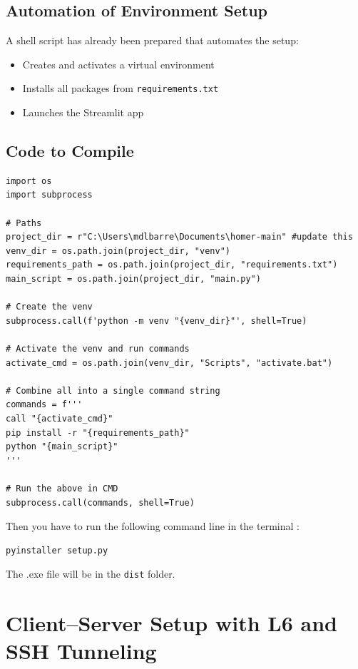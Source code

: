 \documentclass[11pt,a4paper]{report}
\begin{document}
\subsection*{Automation of Environment Setup}

A shell script has already been prepared that automates the setup:
\begin{itemize}
    \item Creates and activates a virtual environment
    \item Installs all packages from \texttt{requirements.txt}
    \item Launches the Streamlit app
\end{itemize}

\subsection*{Code to Compile}


\vspace{0.5em}
\begin{lstlisting}[caption={setup.py file in the main root to compile}]
import os
import subprocess

# Paths 
project_dir = r"C:\Users\mdlbarre\Documents\homer-main" #update this
venv_dir = os.path.join(project_dir, "venv")
requirements_path = os.path.join(project_dir, "requirements.txt")
main_script = os.path.join(project_dir, "main.py")

# Create the venv
subprocess.call(f'python -m venv "{venv_dir}"', shell=True)

# Activate the venv and run commands
activate_cmd = os.path.join(venv_dir, "Scripts", "activate.bat")

# Combine all into a single command string
commands = f'''
call "{activate_cmd}"
pip install -r "{requirements_path}"
python "{main_script}"
'''

# Run the above in CMD
subprocess.call(commands, shell=True)
\end{lstlisting}

Then you have to run the following command line in the terminal : 

\begin{lstlisting}
pyinstaller setup.py 
\end{lstlisting}

The .exe file will be in the \texttt{dist} folder.



\section{Client–Server Setup with L6 and SSH Tunneling}
\end{document}
